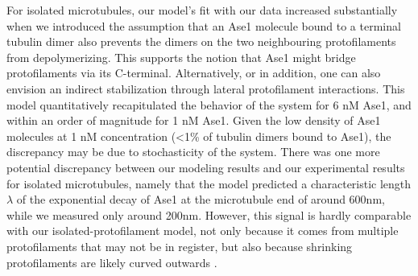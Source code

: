 For isolated microtubules, our model's fit with our data increased substantially when we introduced the assumption that an Ase1 molecule bound to a terminal tubulin dimer also prevents the dimers on the two neighbouring protofilaments from depolymerizing. This supports the notion that Ase1 might bridge protofilaments via its C-terminal. Alternatively, or in addition, one can also envision an indirect stabilization through lateral protofilament interactions. This model quantitatively recapitulated the behavior of the system for 6 nM Ase1, and within an order of magnitude for 1 nM Ase1. Given the low density of Ase1 molecules at 1 nM concentration (<1\% of tubulin dimers bound to Ase1), the discrepancy may be due to stochasticity of the system. There was one more potential discrepancy between our modeling results and our experimental results for isolated microtubules, namely that the model predicted a characteristic length $\lambda$ of the exponential decay of Ase1 at the microtubule end of around 600nm, while we measured only around 200nm. However, this signal is hardly comparable with our isolated-protofilament model, not only because it comes from multiple protofilaments that may not be in register, but also because shrinking protofilaments are likely curved outwards \parencite{McIntosh2008}. \par

